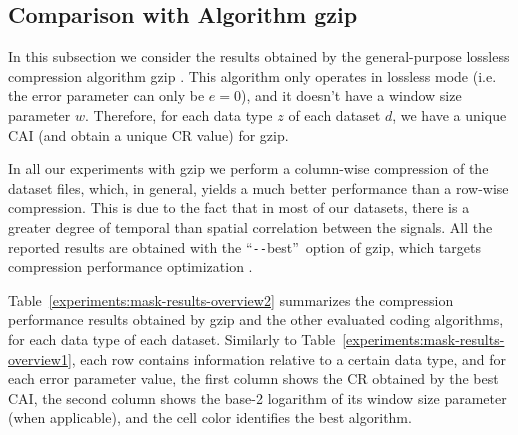
\subsection{Comparison with Algorithm gzip}
\label{secX:gzip}


\newcommand{\bestdash}{``\texttt{-{}-}best''}
In this subsection we consider the results obtained by the general-purpose lossless compression algorithm gzip \cite{gzip}. This algorithm only operates in lossless mode (i.e. the error parameter can only be $e=0$), and it doesn't have a window size parameter $w$. Therefore, for each data type $z$ of each dataset $d$, we have a unique CAI (and obtain a unique CR value) for gzip. 


In all our experiments with gzip we perform a column-wise compression of the dataset files, which, in general, yields a much better performance than a row-wise compression. This is due to the fact that in most of our datasets, there is a greater degree of temporal than spatial correlation between the signals. All the reported results are obtained with the \bestdash\ option of gzip, which targets compression performance optimization \cite{gzipman}. 


Table~\ref{experiments:mask-results-overview2} summarizes the compression performance results obtained by gzip and the other evaluated coding algorithms, for each data type of each dataset. Similarly to Table~\ref{experiments:mask-results-overview1}, each row contains information relative to a certain data type, and for each error parameter value, the first column shows the CR obtained by the best CAI, the second column shows the base-2 logarithm of its window size parameter (when applicable), and the cell color identifies the best algorithm. 



